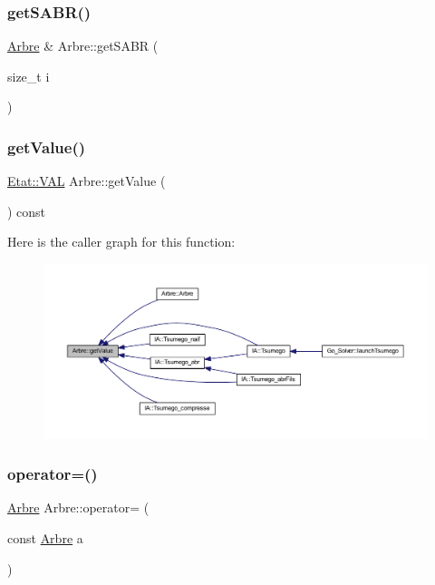 \subsubsection{\texorpdfstring{get\+S\+A\+B\+R()}{getSABR()}\hspace{0.1cm}{\footnotesize\ttfamily [2/2]}}
{\footnotesize\ttfamily \hyperlink{class_arbre}{Arbre} \& Arbre\+::get\+S\+A\+BR (\begin{DoxyParamCaption}\item[{size\+\_\+t}]{i }\end{DoxyParamCaption})}

\mbox{\label{class_arbre_aeaa93d0b192e3cce04adb509b6b29c40}} 
\subsubsection{\texorpdfstring{get\+Value()}{getValue()}}
{\footnotesize\ttfamily \hyperlink{class_etat_af3ddb2296ffc379b7f3ad2bf832f294e}{Etat\+::\+V\+AL} Arbre\+::get\+Value (\begin{DoxyParamCaption}{ }\end{DoxyParamCaption}) const}

Here is the caller graph for this function\+:
\nopagebreak
\begin{figure}[H]
\begin{center}
\leavevmode
\includegraphics[width=350pt]{class_arbre_aeaa93d0b192e3cce04adb509b6b29c40_icgraph}
\end{center}
\end{figure}
\mbox{\label{class_arbre_a9983712c900965e153ee7340f80e42c2}} 
\subsubsection{\texorpdfstring{operator=()}{operator=()}}
{\footnotesize\ttfamily \hyperlink{class_arbre}{Arbre} Arbre\+::operator= (\begin{DoxyParamCaption}\item[{const \hyperlink{class_arbre}{Arbre}}]{a }\end{DoxyParamCaption})}

